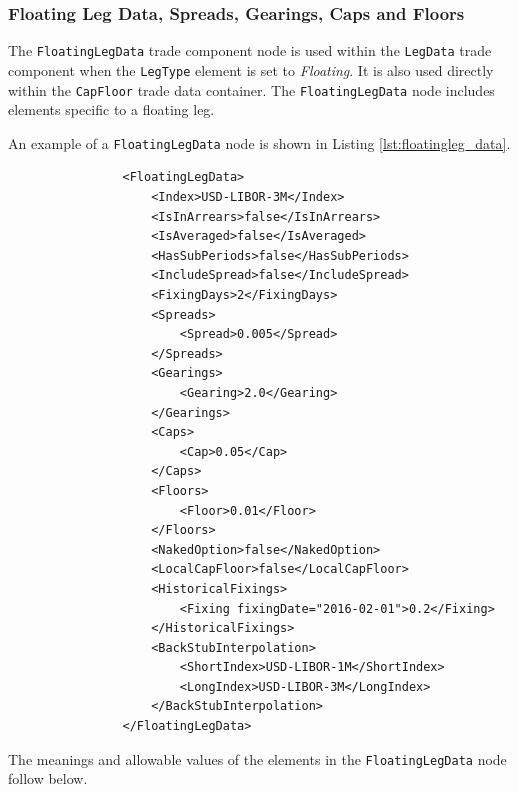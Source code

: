 \subsubsection{Floating Leg Data, Spreads, Gearings, Caps and Floors}
\label{ss:floatingleg_data}

The \lstinline!FloatingLegData! trade component node is used within the \lstinline!LegData! trade component when the
\lstinline!LegType! element is set to \emph{Floating}. It is also used directly within the \lstinline!CapFloor! trade
data container.  The \lstinline!FloatingLegData! node includes elements specific to a floating leg.

An example of a \lstinline!FloatingLegData! node is shown in Listing \ref{lst:floatingleg_data}.
\begin{listing}[H]
\begin{verbatim}
                <FloatingLegData>
                    <Index>USD-LIBOR-3M</Index>
                    <IsInArrears>false</IsInArrears>
                    <IsAveraged>false</IsAveraged>
                    <HasSubPeriods>false</HasSubPeriods>
                    <IncludeSpread>false</IncludeSpread>
                    <FixingDays>2</FixingDays>
                    <Spreads>
                        <Spread>0.005</Spread>
                    </Spreads>
                    <Gearings>
                        <Gearing>2.0</Gearing>
                    </Gearings>
                    <Caps>
                        <Cap>0.05</Cap>
                    </Caps>
                    <Floors>
                        <Floor>0.01</Floor>
                    </Floors>
                    <NakedOption>false</NakedOption>
                    <LocalCapFloor>false</LocalCapFloor>
                    <HistoricalFixings>
                        <Fixing fixingDate="2016-02-01">0.2</Fixing>
                    </HistoricalFixings>
                    <BackStubInterpolation>
                        <ShortIndex>USD-LIBOR-1M</ShortIndex>
                        <LongIndex>USD-LIBOR-3M</LongIndex>
                    </BackStubInterpolation>
                </FloatingLegData>
\end{verbatim}
\caption{Floating leg data}
\label{lst:floatingleg_data}
\end{listing}

The meanings and allowable values of the elements in the \lstinline!FloatingLegData! node follow below.

